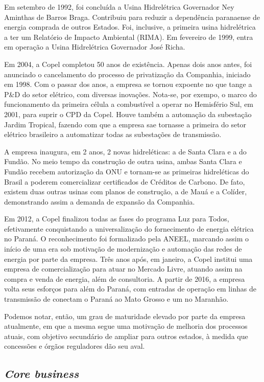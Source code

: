 \documentclass[aprovado,numbers]{coppe}
\begin{document}
  Em setembro de 1992, foi concluída a Usina Hidrelétrica Governador Ney Aminthas de Barros Braga. Contribuiu para reduzir a dependência paranaense de energia comprada de outros Estados. Foi, inclusive, a primeira usina hidrelétrica a ter um Relatório de Impacto Ambiental (RIMA). Em fevereiro de 1999, entra em operação a Usina Hidrelétrica Governador José Richa.

  Em 2004, a Copel completou 50 anos de existência. Apenas dois anos antes, foi anunciado o cancelamento do processo de privatização da Companhia, iniciado em 1998. Com o passar dos anos, a empresa se tornou expoente no que tange a P\&D do setor elétrico, com diversas inovações. Nota-se, por exempo, o marco do funcionamento da primeira célula a combustível a operar no Hemisfério Sul, em 2001, para suprir o CPD da Copel. Houve também a automação da subestação Jardim Tropical, fazendo com que a empresa sae tornasse a primeira do setor elétrico brasileiro a automatizar todas as subestações de transmissão.

  A empresa inaugura, em 2 anos, 2 novas hidreléticas: a de Santa Clara e a do Fundão. No meio tempo da construção de outra usina, ambas Santa Clara e Fundão recebem autorização da ONU e tornam-se as primeiras hidreléticas do Brasil a poderem comercializar certificados de Créditos de Carbono. De fato, existem duas outras usinas com planos de construção, a de Mauá e a Colíder, demonstrando assim a demanda de expansão da Companhia.

  Em 2012, a Copel finalizou todas as fases do programa Luz para Todos, efetivamente conquistando a universalização do fornecimento de energia elétrica no Paraná. O reconhecimento foi formalizado pela ANEEL, marcando assim o início de uma era sob motivação de modernização e automação das redes de energia por parte da empresa. Três anos após, em janeiro, a Copel institui uma empresa de comercialização para atuar no Mercado Livre, atuando assim na compra e venda de energia, além de consultoria. A partir de 2016, a empresa volta seus esforços para além do Paraná, com entradas de operação em linhas de transmissão de conectam o Paraná ao Mato Grosso e um no Maranhão.

  Podemos notar, então, um grau de maturidade elevado por parte da empresa atualmente, em que a mesma segue uma motivação de melhoria dos processos atuais, com objetivo secundário de ampliar para outros estados, à medida que concessões e órgãos reguladores dão seu aval.

  \hypertarget{core-business}{%
  \subsection{\texorpdfstring{\emph{Core business}}{Core business}}\label{core-business}}
\end{document}
